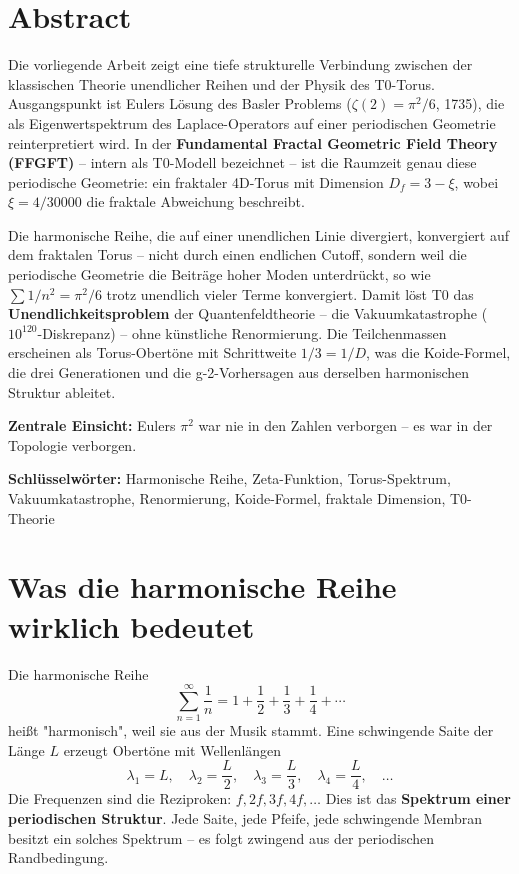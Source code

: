 
	\section*{Abstract}
	Die vorliegende Arbeit zeigt eine tiefe strukturelle Verbindung zwischen der klassischen Theorie unendlicher Reihen und der Physik des T0-Torus. Ausgangspunkt ist Eulers Lösung des Basler Problems ($\zeta(2) = \pi^2/6$, 1735), die als Eigenwertspektrum des Laplace-Operators auf einer periodischen Geometrie reinterpretiert wird. In der \textbf{Fundamental Fractal Geometric Field Theory (FFGFT)} -- intern als T0-Modell bezeichnet -- ist die Raumzeit genau diese periodische Geometrie: ein fraktaler 4D-Torus mit Dimension $D_f = 3 - \xi$, wobei $\xi = 4/30000$ die fraktale Abweichung beschreibt.
	
	Die harmonische Reihe, die auf einer unendlichen Linie divergiert, konvergiert auf dem fraktalen Torus -- nicht durch einen endlichen Cutoff, sondern weil die periodische Geometrie die Beiträge hoher Moden unterdrückt, so wie $\sum 1/n^2 = \pi^2/6$ trotz unendlich vieler Terme konvergiert. Damit löst T0 das \textbf{Unendlichkeitsproblem} der Quantenfeldtheorie -- die Vakuumkatastrophe ($10^{120}$-Diskrepanz) -- ohne künstliche Renormierung. Die Teilchenmassen erscheinen als Torus-Obertöne mit Schrittweite $1/3 = 1/D$, was die Koide-Formel, die drei Generationen und die g-2-Vorhersagen aus derselben harmonischen Struktur ableitet.
	
	\textbf{Zentrale Einsicht:} Eulers $\pi^2$ war nie in den Zahlen verborgen -- es war in der Topologie verborgen.
	
	\textbf{Schlüsselwörter:} Harmonische Reihe, Zeta-Funktion, Torus-Spektrum, Vakuumkatastrophe, Renormierung, Koide-Formel, fraktale Dimension, T0-Theorie
	
	
	\section{Was die harmonische Reihe wirklich bedeutet}
	
	Die harmonische Reihe
	\begin{equation}
		\sum_{n=1}^{\infty} \frac{1}{n} = 1 + \frac{1}{2} + \frac{1}{3} + \frac{1}{4} + \cdots
		\label{eq:harmonic}
	\end{equation}
	heißt "harmonisch", weil sie aus der Musik stammt. Eine schwingende Saite der Länge $L$ erzeugt Obertöne mit Wellenlängen
	\begin{equation}
		\lambda_1 = L, \quad \lambda_2 = \frac{L}{2}, \quad \lambda_3 = \frac{L}{3}, \quad \lambda_4 = \frac{L}{4}, \quad \ldots
	\end{equation}
	Die Frequenzen sind die Reziproken: $f, 2f, 3f, 4f, \ldots$ Dies ist das \textbf{Spektrum einer periodischen Struktur}. Jede Saite, jede Pfeife, jede schwingende Membran besitzt ein solches Spektrum -- es folgt zwingend aus der periodischen Randbedingung.
	
